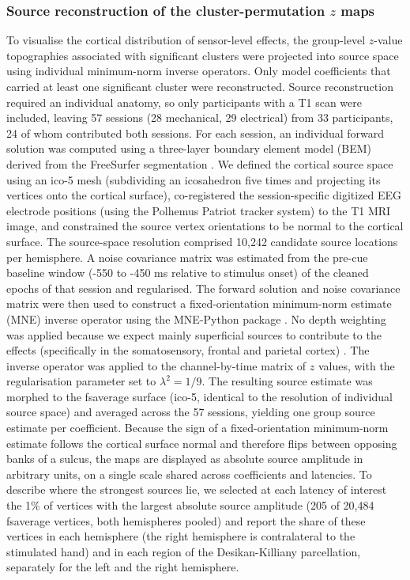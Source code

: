 \documentclass[11pt,a4paper,onecolumn]{article}
\begin{document}
\subsubsection*{Source reconstruction of the cluster-permutation $z$ maps}
\vspace{-7pt}
\label{sourcerec_zmaps}
To visualise the cortical distribution of sensor-level effects, the group-level $z$-value topographies associated with significant clusters were projected into source space using individual minimum-norm inverse operators. Only model coefficients that carried at least one significant cluster were reconstructed. Source reconstruction required an individual anatomy, so only participants with a T1 scan were included, leaving 57 sessions (28 mechanical, 29 electrical) from 33 participants, 24 of whom contributed both sessions.
For each session, an individual forward solution was computed using a three-layer boundary element model (BEM) derived from the FreeSurfer segmentation \cite{segonne_hybrid_2004, dale_cortical_1999, fischl_freesurfer_2012}.
We defined the cortical source space using an ico-5 mesh (subdividing an icosahedron five times and projecting its vertices onto the cortical surface), co-registered the session-specific digitized EEG electrode positions (using the Polhemus Patriot tracker system) to the T1 MRI image, and constrained the source vertex orientations to be normal to the cortical surface. The source-space resolution comprised 10,242 candidate source locations per hemisphere. A noise covariance matrix was estimated from the pre-cue baseline window (-550 to -450 ms relative to stimulus onset) of the cleaned epochs of that session and regularised. The forward solution and noise covariance matrix were then used to construct a fixed-orientation minimum-norm estimate (MNE) inverse operator using the MNE-Python package \cite{gramfort_mne_2014}. 
No depth weighting was applied because we expect mainly superficial sources to contribute to the effects (specifically in the somatosensory, frontal and parietal cortex) \cite{caullerNeuralBasisBehaviorally1991, caullerLayerPrimarySensory1995, allisonHumanCorticalPotentials1989, allisonRelationshipHumanLonglatency1992}.
The inverse operator was applied to the channel-by-time matrix of $z$ values, with the regularisation parameter set to $\lambda^2 = 1/9$. The resulting source estimate was morphed to the fsaverage surface (ico-5, identical to the resolution of individual source space) and averaged across the 57 sessions, yielding one group source estimate per coefficient.
Because the sign of a fixed-orientation minimum-norm estimate follows the cortical surface normal and therefore flips between opposing banks of a sulcus, the maps are displayed as absolute source amplitude in arbitrary units, on a single scale shared across coefficients and latencies. To describe where the strongest sources lie, we selected at each latency of interest the 1\% of vertices with the largest absolute source amplitude (205 of 20,484 fsaverage vertices, both hemispheres pooled) and report the share of these vertices in each hemisphere (the right hemisphere is contralateral to the stimulated hand) and in each region of the Desikan-Killiany parcellation, separately for the left and the right hemisphere.
\end{document}
